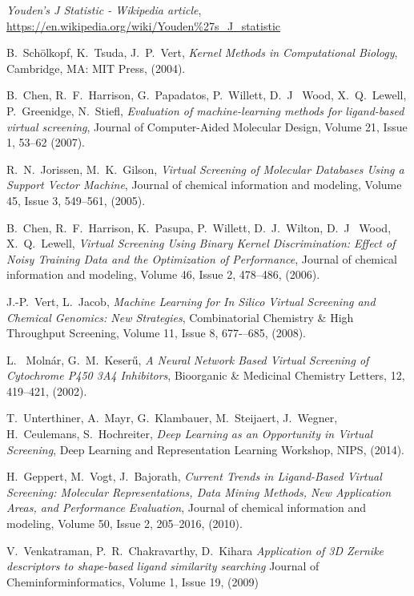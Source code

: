 \documentclass[a4paper,10pt]{report}
\begin{document}
\begin{thebibliography}{99}
     \textit{Youden's J Statistic - Wikipedia article},
     \url{https://en.wikipedia.org/wiki/Youden%27s_J_statistic}
     
     B.~Sch{\"o}lkopf, K.~Tsuda, J.~P.~Vert,
     \textit{Kernel Methods in Computational Biology},
     Cambridge, MA: MIT Press,
     (2004).

     B.~Chen, R.~F.~Harrison, G.~Papadatos, P.~Willett, D.~J~ Wood, X.~Q.~Lewell, P.~Greenidge, N.~Stiefl,
     \textit{Evaluation of machine-learning methods for ligand-based virtual screening},
     Journal of Computer-Aided Molecular Design, Volume 21, Issue 1, 53--62
     (2007).
     
     R.~N.~Jorissen, M.~K.~Gilson,
     \textit{Virtual Screening of Molecular Databases Using a Support Vector Machine},
     Journal of chemical information and modeling, Volume 45, Issue 3, 549--561,
     (2005).
     
     B.~Chen, R.~F.~Harrison, K.~Pasupa, P.~Willett, D.~J.~Wilton, D.~J~ Wood, X.~Q.~Lewell,
     \textit{Virtual Screening Using Binary Kernel Discrimination: Effect of Noisy Training Data and the Optimization of Performance},
     Journal of chemical information and modeling, Volume 46, Issue 2, 478--486,
     (2006).
     
     J.-P.~Vert, L.~Jacob,
     \textit{Machine Learning for In Silico Virtual Screening and Chemical Genomics: New Strategies},
     Combinatorial Chemistry \& High Throughput Screening, Volume 11, Issue 8, 677-–685,
     (2008).
     
     L.~ Moln\'{a}r, G.~M.~Keser\H{u},
     \textit{A Neural Network Based Virtual Screening of Cytochrome P450 3A4 Inhibitors},
     Bioorganic \& Medicinal Chemistry Letters, 12, 419--421,
     (2002).
     
    T.~Unterthiner, A.~Mayr, G.~Klambauer, M.~Steijaert, J.~Wegner, H.~Ceulemans, S.~Hochreiter,
    \textit{Deep Learning as an Opportunity in Virtual Screening},
    Deep Learning and Representation Learning Workshop, NIPS,
    (2014).
    
    H.~Geppert, M.~Vogt, J.~Bajorath,
    \textit{Current Trends in Ligand-Based Virtual Screening: Molecular Representations, Data Mining Methods, New Application Areas, and Performance Evaluation},
    Journal of chemical information and modeling, Volume 50, Issue 2, 205--2016,
    (2010).
    
    V.~Venkatraman, P.~R.~Chakravarthy, D.~Kihara
    \textit{Application of 3D Zernike descriptors to shape-based ligand similarity searching}
    Journal of Cheminforminformatics, Volume 1, Issue 19, 
    (2009)
    
     
    
  \end{thebibliography}
  
    
\end{document}
